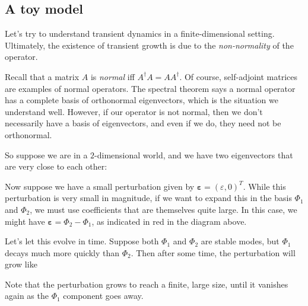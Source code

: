 \documentclass[a4paper]{article}
\begin{document}
\subsection{A toy model}
Let's try to understand transient dynamics in a finite-dimensional setting. Ultimately, the existence of transient growth is due to the \emph{non-normality} of the operator.

Recall that a matrix $A$ is \emph{normal} iff $A^\dagger A = A A^\dagger$. Of course, self-adjoint matrices are examples of normal operators. The spectral theorem says a normal operator has a complete basis of orthonormal eigenvectors, which is the situation we understand well. However, if our operator is not normal, then we don't necessarily have a basis of eigenvectors, and even if we do, they need not be orthonormal.

So suppose we are in a $2$-dimensional world, and we have two eigenvectors that are very close to each other:
\begin{center}
\end{center}
Now suppose we have a small perturbation given by $\boldsymbol\varepsilon = (\varepsilon, 0)^T$. While this perturbation is very small in magnitude, if we want to expand this in the basis $\Phi_1$ and $\Phi_2$, we must use coefficients that are themselves quite large. In this case, we might have $\boldsymbol\varepsilon = \Phi_2 - \Phi_1$, as indicated in red in the diagram above.

Let's let this evolve in time. Suppose both $\Phi_1$ and $\Phi_2$ are stable modes, but $\Phi_1$ decays much more quickly than $\Phi_2$. Then after some time, the perturbation will grow like
\begin{center}
\end{center}
Note that the perturbation grows to reach a finite, large size, until it vanishes again as the $\Phi_1$ component goes away.
\end{document}
